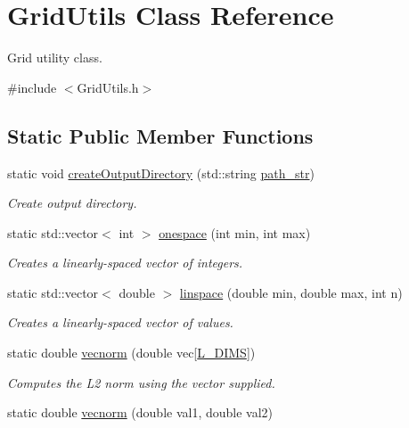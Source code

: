 \hypertarget{class_grid_utils}{}\section{Grid\+Utils Class Reference}
\label{class_grid_utils}


Grid utility class.  




{\ttfamily \#include $<$Grid\+Utils.\+h$>$}

\subsection*{Static Public Member Functions}
\begin{DoxyCompactItemize}
\item 
static void \hyperlink{class_grid_utils_af931614cb5eab6b906aa01106089b628}{create\+Output\+Directory} (std\+::string \hyperlink{class_grid_utils_a9b58748e9e05e84852962d7abc7942e3}{path\+\_\+str})
\begin{DoxyCompactList}\small\item\em Create output directory. \end{DoxyCompactList}\item 
static std\+::vector$<$ int $>$ \hyperlink{class_grid_utils_a1f0d4a76be76a743c368c9a1d4d46cbc}{onespace} (int min, int max)
\begin{DoxyCompactList}\small\item\em Creates a linearly-\/spaced vector of integers. \end{DoxyCompactList}\item 
static std\+::vector$<$ double $>$ \hyperlink{class_grid_utils_a2f172a6dd8b2749ca1c8336a64a07e29}{linspace} (double min, double max, int n)
\begin{DoxyCompactList}\small\item\em Creates a linearly-\/spaced vector of values. \end{DoxyCompactList}\item 
static double \hyperlink{class_grid_utils_a1e0d0da69ec1543835b98bca884f8927}{vecnorm} (double vec\mbox{[}\hyperlink{definitions_8h_a31d5945080ee5c34edc32e6f74c724c8}{L\+\_\+\+D\+I\+MS}\mbox{]})
\begin{DoxyCompactList}\small\item\em Computes the L2 norm using the vector supplied. \end{DoxyCompactList}\item 
static double \hyperlink{class_grid_utils_ae7d797edf50b3c3a448d59684a135aee}{vecnorm} (double val1, double val2)

\end{DoxyCompactItemize}
